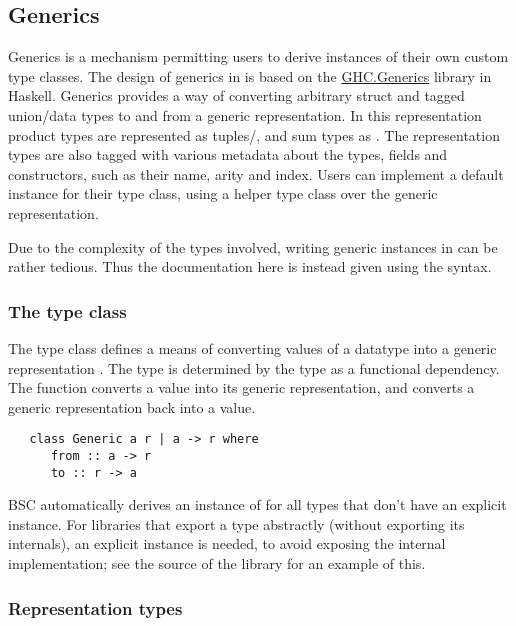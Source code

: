 \subsection{Generics}


Generics is a mechanism permitting users to derive instances of their own custom type classes.
The design of generics in \BS{} is based on the
\href{https://hackage.haskell.org/package/base-4.19.0.0/docs/GHC-Generics.html}{GHC.Generics}
library in Haskell.
Generics provides a way of converting arbitrary struct and tagged union/data types
to and from a generic representation. In this representation product types are represented as tuples/,
and sum types as . The representation types are also tagged with various metadata
about the types, fields and constructors, such as their name, arity and index.
Users can implement a default instance for their type class, using a helper type class over the generic representation.

Due to the complexity of the types involved, writing generic instances in \BSVFull{} can be rather tedious.
Thus the documentation here is instead given using the \BHFull{} syntax.

\subsubsection{The  type class}

The  type class defines a means of converting
values of a datatype  into a generic representation .
The type  is determined by the type  as a functional dependency.
The function  converts a value into its generic representation,
and  converts a generic representation back into a value.

\begin{verbatim}
   class Generic a r | a -> r where
      from :: a -> r
      to :: r -> a
\end{verbatim}

BSC automatically derives an instance of  for all types that
don't have an explicit instance.  For libraries that export a type
abstractly (without exporting its internals), an explicit instance is
needed, to avoid exposing the internal implementation; see the source of the 
library for an example of this.

\subsubsection{Representation types}

